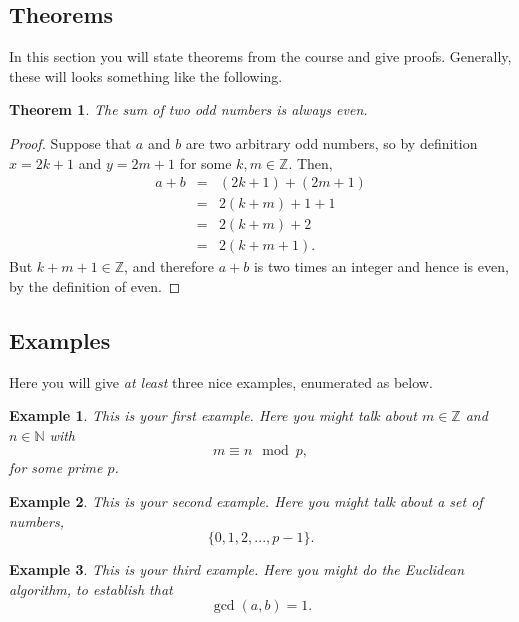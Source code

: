 \documentclass[12pt]{article}
\newtheorem{theorem}{Theorem}
\newtheorem{example}{Example}
\def\N {{\mathbb N}}
\def\Z {{\mathbb Z}}
\begin{document}
\subsection{Theorems}

In this section you will state theorems from the course and give proofs.  Generally, these will looks something like the following. 

\begin{theorem}
The sum of two odd numbers is always even. 
\end{theorem}

\begin{proof}
Suppose that $a$ and $b$ are two arbitrary odd numbers, so by definition $x=2k+1$ and $y=2m+1$ for some $k,m\in \Z$.  Then,
\begin{eqnarray*}
a+b&=&(2k+1)+(2m+1)\\
&=& 2(k+m)+1+1\\
&=&2(k+m)+2\\
&=&2(k+m+1).
\end{eqnarray*}
But $k+m+1\in\Z$, and therefore $a+b$ is two times an integer and hence is even, by the definition of even. 
\end{proof}

\subsection{Examples}

Here you will give {\em at least} three nice examples, enumerated as below.  

\begin{example} This is your first example.  Here you might talk about $m\in \Z$ and  $n\in \N$ with
\[
m\equiv n\mod p,
\]
for some prime $p$. 
\end{example}

\begin{example}  This is your second example.  Here you might talk about a set of numbers, 
\[
\{0,1,2,...,p-1\}.
\]

\end{example}

\begin{example}  This is your third example.  Here you might do the Euclidean algorithm, to establish that 
\[
\gcd(a,b)=1.
\]

\end{example}

\end{document}
